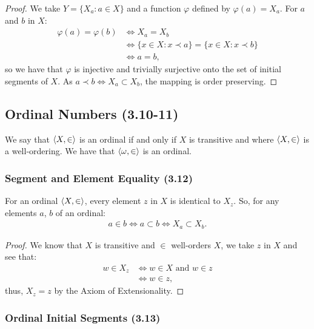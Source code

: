 \begin{proof}
    We take $Y = \{X_a : a \in X\}$ and a function $\varphi$ defined by 
    $\varphi(a) = X_a$. For $a$ and $b$ in $X$: \begin{align*}
        \varphi(a) = \varphi(b) 
        &\Longleftrightarrow X_a = X_b \\
        &\Longleftrightarrow \{x \in X : x \prec a\} = \{x \in X : x \prec b\} \\
        &\Longleftrightarrow a = b,
    \end{align*} so we have that $\varphi$ is injective and trivially
    surjective onto the set of initial segments of $X$.
    As $a \prec b \Longleftrightarrow X_a \subset X_b$, the mapping is order preserving.
\end{proof}

\subsection{Ordinal Numbers (3.10-11)} \label{3.10} \label{3.11}

We say that ${\langle X, \in \rangle}$ is an ordinal if and only if $X$ is transitive and where
${\langle X, \in \rangle}$ is a well-ordering. We have that ${\langle \omega, \in \rangle}$ is an ordinal.

\subsubsection{Segment and Element Equality (3.12)} \label{3.12}

For an ordinal ${\langle X, \in \rangle}$, every element $z$ in $X$ is identical to $X_z$.
So, for any elements $a$, $b$ of an ordinal: \begin{align*}
    a \in b \Longleftrightarrow a \subset b 
    \Longleftrightarrow X_a \subset X_b.
\end{align*}

\begin{proof}
    We know that $X$ is transitive and $\in$ well-orders $X$, we take $z$ in $X$ 
    and see that: \begin{align*}
        w \in X_z
        &\Longleftrightarrow w \in X \text{ and } w \in z \\
        &\Longleftrightarrow w \in z \tag{as $z \subseteq X$},
    \end{align*} thus, $X_z = z$ by the Axiom of Extensionality.
\end{proof} 

\subsubsection{Ordinal Initial Segments (3.13)} \label{3.13}

